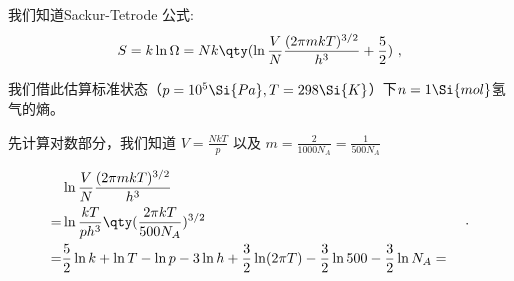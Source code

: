 


我们知道Sackur-Tetrode 公式:
\begin{equation}
S = k\ln \Omega  = Nk \qty(\ln \frac{V}{N} \frac{(2\pi mkT)^{3/2}}{h^3} + \frac52)~,
\end{equation}

我们借此估算标准状态（$p=10^5 \Si{Pa}, T=298\Si{K}$）下$n=1 \Si{mol}$氢气的熵。

先计算对数部分，我们知道 $V=\frac{NkT}{p}$ 以及 $m = \frac{2}{1000 N_A} = \frac{1}{500 N_A}$

$$
\begin{aligned}
 & \ln \frac{V}{N} \frac{(2\pi mkT)^{3/2}}{h^3} \\
 = & \ln \frac{kT}{p h^3} \qty(\frac{2\pi kT}{500 N_A})^{3/2}\\
 = & \frac{5}{2} \ln k + \ln T - \ln p - 3 \ln h + \frac{3}{2} \ln (2 \pi T) - \frac{3}{2} \ln 500 - \frac{3}{2} \ln N_A
 = & \\
\end{aligned}~.
$$